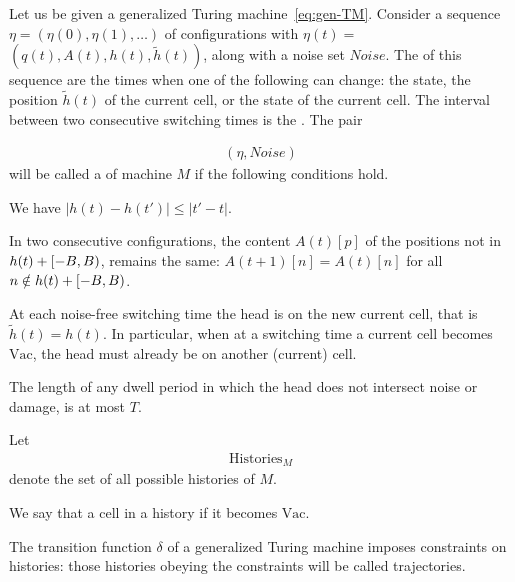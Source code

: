 \documentclass[12pt]{memoir}
\def\B{B}
\newcommand{\h}{h}
\newcommand{\hc}{\tilde h}
\newcommand{\Noise}{\mathit{Noise}}
\newcommand{\Tu}{T}
\newcommand{\Histories}{\mathrm{Histories}}
\newcommand{\Vacant}{\mathrm{Vac}}
\begin{document}
\begin{definition}[History]\label{def:history}
  \begin{sloppypar}
    Let us be given a generalized Turing machine~\eqref{eq:gen-TM}.
    Consider a sequence \( \eta = (\eta(0), \eta(1), \dots) \) of configurations with
    \( \eta(t) = \) \( (q(t), A(t), \h(t), \hc(t)) \), along with a noise set \( \Noise \).
    The  of this sequence 
are the times when one of the following can change:
the state, the position \( \hc(t) \) of the current cell, or the state of the current cell.
The interval between two consecutive switching times is the .
The pair
      \end{sloppypar}
    \begin{align*}
       (\eta,\Noise)
    \end{align*}
    will be called a  of machine \( M \) if the following conditions hold.
        \begin{bullets}
            \item We have \( |\h(t) - \h(t')| \le |t' - t| \).

            \item In two consecutive configurations, the content \( A(t)[p] \) of the positions not in
                  \( \h(t) + \lint{-\B}{\B} \), remains the same:
                  \( A(t+1)[n] = A(t)[n] \) for all \( n \notin \h(t) + \lint{-\B}{\B} \).

            \item At each noise-free switching time the head is on the new current cell, that is
\( \hc(t)=\h(t) \).
In particular, when at a switching time a current cell becomes
\( \Vacant \), the head must already be on another (current) cell.

            \item The length of any dwell period in which the head does not intersect
noise or damage, is at most \( \Tu \).

        \end{bullets}
    Let
        \begin{align*}
            \Histories_{M}
        \end{align*}
    denote the set of all possible histories of \( M \).

We say that a cell  in a history if it becomes \( \Vacant \).

\end{definition}

The transition function \( \delta \) of a generalized Turing machine
imposes constraints on histories: those
histories obeying the constraints will be called trajectories.
\end{document}
